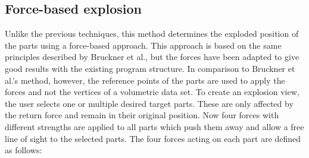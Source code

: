 \subsection{Force-based explosion}
Unlike the previous techniques, this method determines the exploded position of the parts using a force-based approach.
This approach is based on the same principles described by Bruckner et al., but the forces have been adapted to give good results with the existing program structure.\cite{Bruckner_2006}
In comparison to Bruckner et al.'s method, however, the reference points of the parts are used to apply the forces and not the vertices of a volumetric data set.
To create an explosion view, the user selects one or multiple desired target parts. 
These are only affected by the return force and remain in their original position.
Now four forces with different strengths are applied to all parts which push them away and allow a free line of sight to the selected parts.
The four forces acting on each part are defined as follows:
